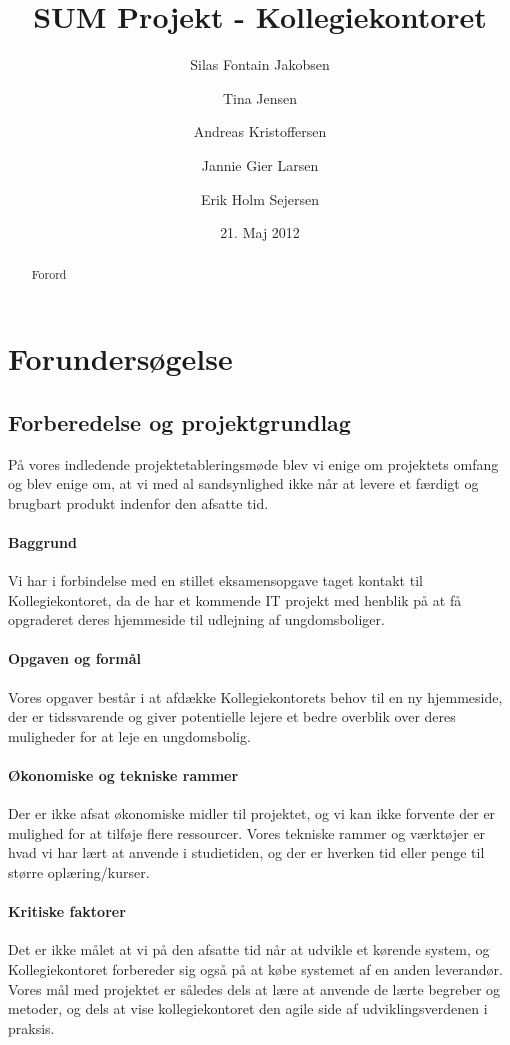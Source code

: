 \documentclass[12pt, a4paper]{report}
\title{SUM Projekt - Kollegiekontoret}
\author{Silas Fontain Jakobsen \and Tina Jensen \and Andreas Kristoffersen \and Jannie Gier Larsen \and Erik Holm Sejersen}
\date{21. Maj 2012}
\begin{document}
\begin{titlepage}
\maketitle
\end{titlepage}

\begin{abstract}
Forord
\end{abstract}

\tableofcontents

\chapter{Forundersøgelse}

\section{Forberedelse og projektgrundlag}
På vores indledende projektetableringsmøde blev vi enige om projektets omfang og blev enige om, at vi med al sandsynlighed ikke når at levere et færdigt og brugbart produkt indenfor den afsatte tid.

\subsubsection{Baggrund}
Vi har i forbindelse med en stillet eksamensopgave taget kontakt til Kollegiekontoret, da de har et kommende IT projekt med henblik på at få opgraderet deres hjemmeside til udlejning af ungdomsboliger.

\subsubsection{Opgaven og formål}
Vores opgaver består i at afdække Kollegiekontorets behov til en ny hjemmeside, der er tidssvarende og giver potentielle lejere et bedre overblik over deres muligheder for at leje en ungdomsbolig.

\subsubsection{Økonomiske og tekniske rammer}
Der er ikke afsat økonomiske midler til projektet, og vi kan ikke forvente der er mulighed for at tilføje flere ressourcer. Vores tekniske rammer og værktøjer er hvad vi har lært at anvende i studietiden, og der er hverken tid eller penge til større oplæring/kurser.

\subsubsection{Kritiske faktorer}
Det er ikke målet at vi på den afsatte tid når at udvikle et kørende system, og Kollegiekontoret forbereder sig også på at købe systemet af en anden leverandør. Vores mål med projektet er således dels at lære at anvende de lærte begreber og metoder, og dels at vise kollegiekontoret den agile side af udviklingsverdenen i praksis.
\end{document}
